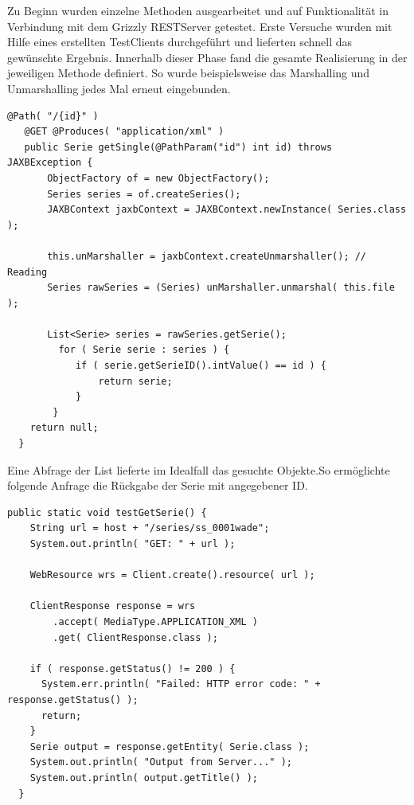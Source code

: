 \newpage
Zu Beginn wurden einzelne Methoden ausgearbeitet und auf Funktionalität in Verbindung mit dem Grizzly RESTServer getestet. Erste Versuche wurden mit Hilfe eines erstellten TestClients durchgeführt und lieferten schnell das gewünschte Ergebnis.
Innerhalb dieser Phase fand  die gesamte Realisierung in der jeweiligen Methode definiert. So wurde beispielsweise das Marshalling und Unmarshalling jedes Mal erneut eingebunden.

\begin{lstlisting}[label=listsservice,caption= GET Testmethode der SeriesID]
   @Path( "/{id}" )
   @GET @Produces( "application/xml" )
   public Serie getSingle(@PathParam("id") int id) throws JAXBException {
       ObjectFactory of = new ObjectFactory();
       Series series = of.createSeries();
       JAXBContext jaxbContext = JAXBContext.newInstance( Series.class );

       this.unMarshaller = jaxbContext.createUnmarshaller(); // Reading
       Series rawSeries = (Series) unMarshaller.unmarshal( this.file );

       List<Serie> series = rawSeries.getSerie();
         for ( Serie serie : series ) {
            if ( serie.getSerieID().intValue() == id ) {
                return serie;
            }
        }
    return null;
  }
\end{lstlisting}

Eine Abfrage der List lieferte im Idealfall das gesuchte Objekte.So ermöglichte folgende Anfrage die Rückgabe der Serie mit angegebener ID.

\begin{lstlisting}[label=testclient,caption= Anfrage des Testclients nach Serie mit angegebener ID]
public static void testGetSerie() {
    String url = host + "/series/ss_0001wade";
    System.out.println( "GET: " + url );

    WebResource wrs = Client.create().resource( url );

    ClientResponse response = wrs
        .accept( MediaType.APPLICATION_XML )
        .get( ClientResponse.class );

    if ( response.getStatus() != 200 ) {
      System.err.println( "Failed: HTTP error code: " + response.getStatus() );
      return;
    }
    Serie output = response.getEntity( Serie.class );
    System.out.println( "Output from Server..." );
    System.out.println( output.getTitle() );
  }
\end{lstlisting}

\newpage

